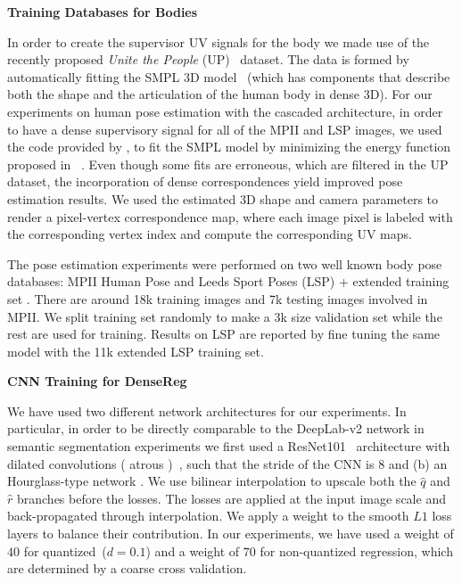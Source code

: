  \textbf{Training Databases for Bodies}
 
 In order to create the supervisor UV signals for the body we made use of the recently proposed \textit{Unite the People} (UP)~\cite{lassner2017unite} dataset. The data is formed by automatically fitting the SMPL 3D model~\cite{loper2015smpl} (which has components that describe both the shape and the articulation of the human body in dense 3D). 
 For our experiments on human pose estimation with the cascaded architecture, in order to have a dense supervisory signal for all of the MPII and LSP images, we used the code provided by \cite{lassner2017unite}, to fit the SMPL model by minimizing the energy function proposed in ~\cite{bogo2016keep}. Even though some fits are erroneous, which are filtered in the UP dataset, the incorporation of dense correspondences yield improved pose estimation results. We used the estimated 3D shape and camera parameters to render a pixel-vertex correspondence map, where each image pixel is labeled with the corresponding vertex index and compute the corresponding UV maps. 
 
 The pose estimation experiments were performed on two well known body pose databases: MPII Human Pose \cite{andriluka20142d} and Leeds Sport Poses (LSP) + extended training set \cite{Johnson10}. There are around 18k training images and 7k testing images involved in MPII. We split training set randomly to make a 3k size validation set while the rest are used for training. Results on LSP are reported by fine tuning the same model with the 11k extended LSP training set.

\textbf{CNN Training for DenseReg} 

We have used two different network architectures for our experiments. In particular, in order to be directly comparable to the DeepLab-v2 network in semantic segmentation experiments we first used a ResNet101~\cite{He2015} architecture with dilated convolutions ( atrous )~\cite{CP2015Semantic,mallat1999wavelet}, such that the stride of the CNN is $8$ and (b) an Hourglass-type network \cite{newell2016stacked}. We use bilinear interpolation to upscale both the $\hat{q}$ and $\hat{r}$ branches before the losses. The losses are applied at the input image scale and back-propagated through interpolation. We apply a weight to the smooth $L1$ loss layers to balance their contribution. In our experiments, we have used a weight of $40$ for quantized~($d=0.1$) and a weight of $70$ for non-quantized regression, which are determined by a coarse cross validation. 

